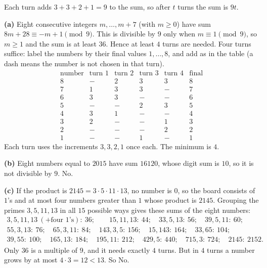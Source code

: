Each turn adds $3+3+2+1=9$ to the sum, so after $t$ turns the sum is $9t$.

\textbf{(a)} Eight consecutive integers $m,\dots,m+7$ (with $m\ge0$) have sum $8m+28\equiv-m+1\pmod9$. This is divisible by $9$ only when $m\equiv1\pmod9$, so $m\ge1$ and the sum is at least $36$. Hence at least $4$ turns are needed. Four turns suffice: label the numbers by their final values $1,\dots,8$, and add as in the table (a dash means the number is not chosen in that turn).
\[\begin{array}{c|cccc|c}
\text{number} & \text{turn 1} & \text{turn 2} & \text{turn 3} & \text{turn 4} & \text{final}\\\hline
8 & - & 2 & 3 & 3 & 8\\
7 & 1 & 3 & 3 & - & 7\\
6 & 3 & 3 & - & - & 6\\
5 & - & - & 2 & 3 & 5\\
4 & 3 & 1 & - & - & 4\\
3 & 2 & - & - & 1 & 3\\
2 & - & - & - & 2 & 2\\
1 & - & - & 1 & - & 1
\end{array}\]
Each turn uses the increments $3,3,2,1$ once each. The minimum is $\boxed{4}$.

\textbf{(b)} Eight numbers equal to $2015$ have sum $16120$, whose digit sum is $10$, so it is not divisible by $9$. $\boxed{\text{No.}}$

\textbf{(c)} If the product is $2145=3\cdot5\cdot11\cdot13$, no number is $0$, so the board consists of $1$'s and at most four numbers greater than $1$ whose product is $2145$. Grouping the primes $3,5,11,13$ in all $15$ possible ways gives these sums of the eight numbers:
\[\begin{array}{l}
3,5,11,13\ (+\text{four }1\text{'s}):\ 36;\qquad 15,11,13:\ 44;\quad 33,5,13:\ 56;\quad 39,5,11:\ 60;\\
55,3,13:\ 76;\quad 65,3,11:\ 84;\quad 143,3,5:\ 156;\quad 15,143:\ 164;\quad 33,65:\ 104;\\
39,55:\ 100;\quad 165,13:\ 184;\quad 195,11:\ 212;\quad 429,5:\ 440;\quad 715,3:\ 724;\quad 2145:\ 2152.
\end{array}\]
Only $36$ is a multiple of $9$, and it needs exactly $4$ turns. But in $4$ turns a number grows by at most $4\cdot3=12<13$. So $\boxed{\text{No.}}$
